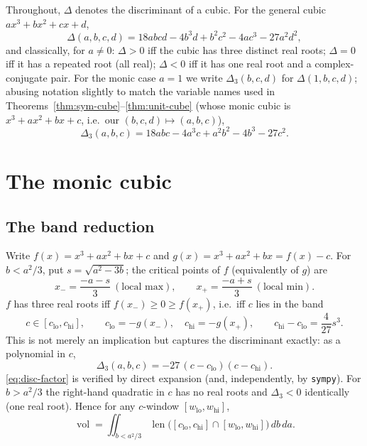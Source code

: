 \documentclass[11pt,reqno]{amsart}
\theoremstyle{plain}
\theoremstyle{remark}
\DeclareMathOperator{\vol}{vol}
\newcommand{\disc}{\Delta}
\begin{document}
Throughout, $\disc$ denotes the discriminant of a cubic. For the general cubic
$ax^3+bx^2+cx+d$,
\begin{equation} \label{eq:disc4}
  \disc(a,b,c,d) = 18abcd - 4b^3d + b^2c^2 - 4ac^3 - 27a^2d^2,
\end{equation}
and classically, for $a\ne0$: $\disc>0$ iff the cubic has three distinct real
roots; $\disc=0$ iff it has a repeated root (all real); $\disc<0$ iff it has
one real root and a complex-conjugate pair. For the monic case $a=1$ we write
$\disc_3(b,c,d)$ for $\disc(1,b,c,d)$; abusing notation slightly to match the
variable names used in Theorems~\ref{thm:sym-cube}--\ref{thm:unit-cube} (whose
monic cubic is $x^3+ax^2+bx+c$, i.e.\ our $(b,c,d)\mapsto(a,b,c)$),
\begin{equation} \label{eq:disc3}
  \disc_3(a,b,c) = 18abc - 4a^3c + a^2b^2 - 4b^3 - 27c^2.
\end{equation}

\section{The monic cubic}

\subsection{The band reduction}

Write $f(x)=x^3+ax^2+bx+c$ and $g(x)=x^3+ax^2+bx=f(x)-c$. For
$b<a^2/3$, put $s=\sqrt{a^2-3b}$; the critical points of $f$ (equivalently of
$g$) are
\[
  x_-=\frac{-a-s}{3}\ (\text{local max}), \qquad x_+=\frac{-a+s}{3}\ (\text{local min}).
\]
$f$ has three real roots iff $f(x_-)\ge 0\ge f(x_+)$, i.e.\ iff $c$ lies in the
band
\[
  c\in[c_{\mathrm{lo}},c_{\mathrm{hi}}], \qquad
  c_{\mathrm{lo}}=-g(x_-),\quad c_{\mathrm{hi}}=-g(x_+),\qquad
  c_{\mathrm{hi}}-c_{\mathrm{lo}}=\frac{4}{27}s^3.
\]
This is not merely an implication but captures the discriminant exactly: as a
polynomial in $c$,
\begin{equation} \label{eq:disc-factor}
  \disc_3(a,b,c) = -27\,(c-c_{\mathrm{lo}})(c-c_{\mathrm{hi}}).
\end{equation}
\eqref{eq:disc-factor} is verified by direct expansion (and, independently, by
\texttt{sympy}). For $b>a^2/3$ the right-hand quadratic in $c$ has no real
roots and $\disc_3<0$ identically (one real root). Hence for any $c$-window
$[w_{\mathrm{lo}},w_{\mathrm{hi}}]$,
\begin{equation} \label{eq:vol-formula}
  \vol = \iint_{b<a^2/3} \operatorname{len}\bigl([c_{\mathrm{lo}},c_{\mathrm{hi}}]\cap[w_{\mathrm{lo}},w_{\mathrm{hi}}]\bigr)\,db\,da.
\end{equation}
\end{document}
